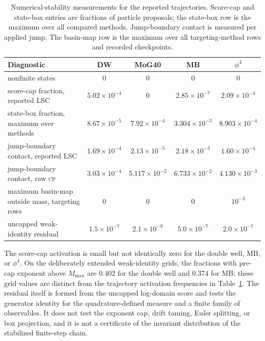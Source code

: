 \documentclass[11pt]{article}
\begin{document}
\begin{table}[!ht]
\centering
\footnotesize
\setlength{\tabcolsep}{3pt}
\begin{tabular}{lcccc}
\toprule
Diagnostic & DW & MoG40 & MB & $\phi^4$\\
\midrule
nonfinite states                              & 0 & 0 & 0 & 0\\
score-cap fraction, reported LSC              & $5.02\times10^{-4}$ & 0 & $2.85\times10^{-7}$ & $2.09\times10^{-4}$\\
state-box fraction, maximum over methods      & $8.67\times10^{-5}$ & $7.92\times10^{-4}$ & $3.304\times10^{-3}$ & $8.903\times10^{-4}$\\
jump-boundary contact, reported LSC           & $1.69\times10^{-4}$ & $2.13\times10^{-5}$ & $2.18\times10^{-3}$ & $1.60\times10^{-4}$\\
jump-boundary contact, raw \textsc{cp}         & $3.03\times10^{-4}$ & $5.117\times10^{-2}$ & $6.733\times10^{-2}$ & $4.130\times10^{-3}$\\
maximum basin-map outside mass, targeting rows
                                               & 0 & 0 & 0 & $10^{-3}$\\
uncapped weak-identity residual               & $1.5\times10^{-7}$ & $2.1\times10^{-8}$ & $5.0\times10^{-7}$ & $2.0\times10^{-7}$\\
\bottomrule
\end{tabular}
\caption{Numerical-stability measurements for the reported trajectories.
Score-cap and state-box entries are fractions of particle proposals; the
state-box row is the maximum over all compared methods.  Jump-boundary contact
is measured per applied jump.  The basin-map row is the maximum over all
targeting-method rows and recorded checkpoints.}
\label{tab:stability}
\end{table}

The score-cap activation is small but not identically zero for the double
well, MB, or $\phi^4$.  On the deliberately extended weak-identity grids, the
fractions with pre-cap exponent above $M_{\max}$ are $0.402$ for the double
well and $0.374$ for MB; these grid values are distinct from the trajectory
activation frequencies in Table~\ref{tab:stability}.  The residual itself is
formed from the uncapped log-domain score and tests the generator identity for
the quadrature-defined measure and a finite family of observables.  It does
not test the exponent cap, drift taming, Euler splitting, or box projection,
and it is not a certificate of the invariant distribution of the stabilized
finite-step chain.
\end{document}
